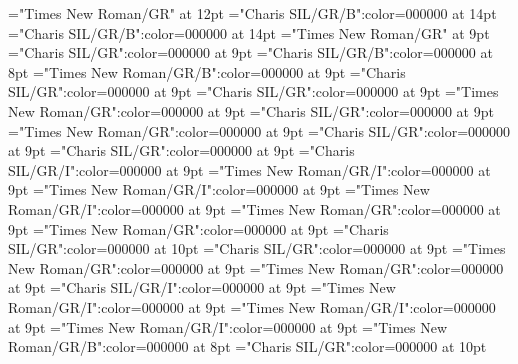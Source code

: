 \documentclass[gps1,twoside]{article}
\begin{document}
\font\xitemtpi="Times New Roman/GR" at 12pt
\font{}="Charis SIL/GR/B":color=000000 at 14pt
\font{}="Charis SIL/GR/B":color=000000 at 14pt
\font{}="Times New Roman/GR" at 9pt
\font\entryletDatadicBody="Charis SIL/GR":color=000000 at 9pt
\font\headwordggoTeluINentryletDatadicBody="Charis SIL/GR/B":color=000000 at 8pt
\font\spanenheadwordggoTeluINentryletDatadicBody="Times New Roman/GR/B":color=000000 at 9pt
\font\pronunciationsentryletDatadicBody="Charis SIL/GR":color=000000 at 9pt
\font\pronunciationggofonipaxemicpronunciationsentryletDatadicBody="Charis SIL/GR":color=000000 at 9pt
\font\spanenpronunciationggofonipaxemicpronunciationsentryletDatadicBody="Times New Roman/GR":color=000000 at 9pt
\font\spanggofonipaxemicpronunciationggofonipaxemicpronunciationsentryletDatadicBody="Charis SIL/GR":color=000000 at 9pt
\font\spanenpronunciationsentryletDatadicBody="Times New Roman/GR":color=000000 at 9pt
\font\sensesentryletDatadicBody="Charis SIL/GR":color=000000 at 9pt
\font\sensesensesentryletDatadicBody="Charis SIL/GR":color=000000 at 9pt
\font\grammaticalinfosensesensesentryletDatadicBody="Charis SIL/GR/I":color=000000 at 9pt
\font\partofspeechengrammaticalinfosensesensesentryletDatadicBody="Times New Roman/GR/I":color=000000 at 9pt
\font\spanenpartofspeechengrammaticalinfosensesensesentryletDatadicBody="Times New Roman/GR/I":color=000000 at 9pt
\font\spanengrammaticalinfosensesensesentryletDatadicBody="Times New Roman/GR/I":color=000000 at 9pt
\font{}="Times New Roman/GR":color=000000 at 9pt
\font\spanendefinitionensensesensesentryletDatadicBody="Times New Roman/GR":color=000000 at 9pt
\font\LexSensepublishStemGlossPubLdtesensesensesentryletDatadicBody="Charis SIL/GR":color=000000 at 10pt
\font\spanteLexSensepublishStemGlossPubLdtesensesensesentryletDatadicBody="Charis SIL/GR":color=000000 at 9pt
\font\spanenLexSensepublishStemGlossPubLdtesensesensesentryletDatadicBody="Times New Roman/GR":color=000000 at 9pt
\font\spanensensesentryletDatadicBody="Times New Roman/GR":color=000000 at 9pt
\font\grammaticalinfosensesentryletDatadicBody="Charis SIL/GR/I":color=000000 at 9pt
\font\partofspeechengrammaticalinfosensesentryletDatadicBody="Times New Roman/GR/I":color=000000 at 9pt
\font\spanenpartofspeechengrammaticalinfosensesentryletDatadicBody="Times New Roman/GR/I":color=000000 at 9pt
\font\spanengrammaticalinfosensesentryletDatadicBody="Times New Roman/GR/I":color=000000 at 9pt
\font\boldxsensenumbersensesensesentryletDatadicBody="Times New Roman/GR/B":color=000000 at 8pt
\font\xitemteLexSensepublishStemGlossPubLdtesensesensesentryletDatadicBody="Charis SIL/GR":color=000000 at 10pt
\end{document}
